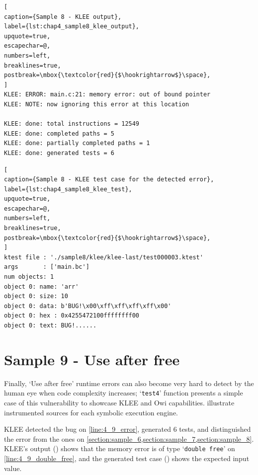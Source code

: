 

\begin{lstlisting}[
caption={Sample 8 - KLEE output},
label={lst:chap4_sample8_klee_output},
upquote=true,
escapechar=@,
numbers=left,
breaklines=true,
postbreak=\mbox{\textcolor{red}{$\hookrightarrow$}\space},
]
KLEE: ERROR: main.c:21: memory error: out of bound pointer
KLEE: NOTE: now ignoring this error at this location

KLEE: done: total instructions = 12549
KLEE: done: completed paths = 5
KLEE: done: partially completed paths = 1
KLEE: done: generated tests = 6
\end{lstlisting}

\begin{lstlisting}[
caption={Sample 8 - KLEE test case for the detected error},
label={lst:chap4_sample8_klee_test},
upquote=true,
escapechar=@,
numbers=left,
breaklines=true,
postbreak=\mbox{\textcolor{red}{$\hookrightarrow$}\space},
]
ktest file : './sample8/klee/klee-last/test000003.ktest'
args       : ['main.bc']
num objects: 1
object 0: name: 'arr'
object 0: size: 10
object 0: data: b'BUG!\x00\xff\xff\xff\xff\x00'
object 0: hex : 0x4255472100ffffffff00
object 0: text: BUG!......
\end{lstlisting}

\section{Sample 9 - Use after free}\label{section:sample_9}

Finally, `Use after free' runtime errors can also become very hard to detect by the human eye when code complexity increases; `\lstinline$test4$' function presents a simple case of this vulnerability to showcase KLEE and Owi capabilities.  illustrate instrumented sources for each symbolic execution engine.

KLEE detected the bug on \cref{line:4_9_error}, generated 6 tests, and distinguished the error from the ones on \cref{section:sample_6,section:sample_7,section:sample_8}. KLEE's output () shows that the memory error is of type `\lstinline$double free$' on \cref{line:4_9_double_free}, and the generated test case () shows the expected input value.

